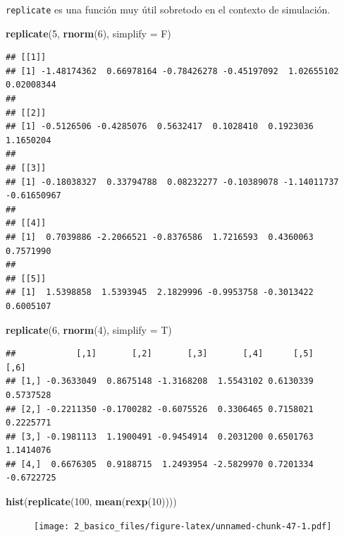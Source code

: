 \documentclass[]{article}
\newenvironment{Shaded}{\begin{snugshade}}{\end{snugshade}}
\newcommand{\KeywordTok}[1]{\textcolor[rgb]{0.13,0.29,0.53}{\textbf{{#1}}}}
\newcommand{\DataTypeTok}[1]{\textcolor[rgb]{0.13,0.29,0.53}{{#1}}}
\newcommand{\DecValTok}[1]{\textcolor[rgb]{0.00,0.00,0.81}{{#1}}}
\newcommand{\NormalTok}[1]{{#1}}
\begin{document}
\texttt{replicate} es una función muy útil sobretodo en el contexto de
simulación.

\begin{Shaded}
\begin{Highlighting}[]
\KeywordTok{replicate}\NormalTok{(}\DecValTok{5}\NormalTok{, }\KeywordTok{rnorm}\NormalTok{(}\DecValTok{6}\NormalTok{), }\DataTypeTok{simplify =} \NormalTok{F)}
\end{Highlighting}
\end{Shaded}

\begin{verbatim}
## [[1]]
## [1] -1.48174362  0.66978164 -0.78426278 -0.45197092  1.02655102  0.02008344
## 
## [[2]]
## [1] -0.5126506 -0.4285076  0.5632417  0.1028410  0.1923036  1.1650204
## 
## [[3]]
## [1] -0.18038327  0.33794788  0.08232277 -0.10389078 -1.14011737 -0.61650967
## 
## [[4]]
## [1]  0.7039886 -2.2066521 -0.8376586  1.7216593  0.4360063  0.7571990
## 
## [[5]]
## [1]  1.5398858  1.5393945  2.1829996 -0.9953758 -0.3013422  0.6005107
\end{verbatim}

\begin{Shaded}
\begin{Highlighting}[]
\KeywordTok{replicate}\NormalTok{(}\DecValTok{6}\NormalTok{, }\KeywordTok{rnorm}\NormalTok{(}\DecValTok{4}\NormalTok{), }\DataTypeTok{simplify =} \NormalTok{T)}
\end{Highlighting}
\end{Shaded}

\begin{verbatim}
##            [,1]       [,2]       [,3]       [,4]      [,5]       [,6]
## [1,] -0.3633049  0.8675148 -1.3168208  1.5543102 0.6130339  0.5737528
## [2,] -0.2211350 -0.1700282 -0.6075526  0.3306465 0.7158021  0.2225771
## [3,] -0.1981113  1.1900491 -0.9454914  0.2031200 0.6501763  1.1414076
## [4,]  0.6676305  0.9188715  1.2493954 -2.5829970 0.7201334 -0.6722725
\end{verbatim}

\begin{Shaded}
\begin{Highlighting}[]
\KeywordTok{hist}\NormalTok{(}\KeywordTok{replicate}\NormalTok{(}\DecValTok{100}\NormalTok{, }\KeywordTok{mean}\NormalTok{(}\KeywordTok{rexp}\NormalTok{(}\DecValTok{10}\NormalTok{))))}
\end{Highlighting}
\end{Shaded}

\begin{figure}[htbp]
\centering
\texttt{[image: 2\_basico\_files/figure-latex/unnamed-chunk-47-1.pdf]}
\end{figure}
\end{document}
